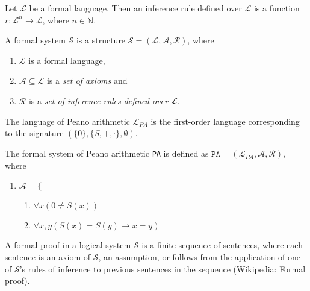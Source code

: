 \begin{definition}
    Let $\mathcal{L}$ be a formal language. Then an inference rule defined over $\mathcal{L}$ is a function $r : \mathcal{L}^n \to \mathcal{L}$, where $n \in \mathbb{N}$.
\end{definition}

\begin{definition}
    A formal system $\mathcal{S}$ is a structure $\mathcal{S} = (\mathcal{L}, \mathcal{A}, \mathcal{R})$, where 
    \begin{enumerate}
        \item $\mathcal{L}$ is a formal language,
        \item $\mathcal{A} \subseteq \mathcal{L}$ is a \textit{set of axioms} and 
        \item $\mathcal{R}$ is a \textit{set of inference rules defined over $\mathcal{L}$}.
    \end{enumerate}
\end{definition}

\begin{definition}
    The language of Peano arithmetic $\mathcal{L}_{PA}$ is the first-order language corresponding to the signature $(\{0\},\{S,+,\cdot\},\emptyset)$.
\end{definition}

\begin{definition}
    The formal system of Peano arithmetic \texttt{PA} is defined as $\texttt{PA} = (\mathcal{L}_{PA},\mathcal{A},\mathcal{R})$, where
    \begin{enumerate}
        \item $\mathcal{A} = \{$ \begin{enumerate}
            \item $\forall x (0 \not = S(x))$
            \item $\forall x,y (S(x) = S(y) \rightarrow x = y)$
        \end{enumerate}
    \end{enumerate}
\end{definition}

\begin{definition}
    \label{def:formal-proof}
    A formal proof in a logical system $\mathcal{S}$ is a finite sequence of sentences, where each sentence is an axiom of $\mathcal{S}$, an assumption, or follows from the application of one of $\mathcal{S}$'s rules of inference to previous sentences in the sequence (Wikipedia: Formal proof).
\end{definition}

